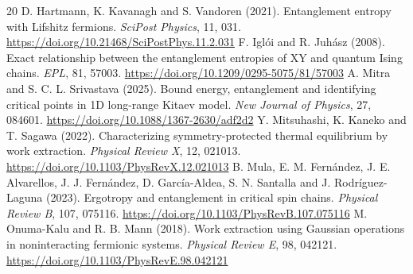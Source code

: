 \documentclass[11pt,a4paper]{article}
\theoremstyle{remark}
\begin{document}
\begin{thebibliography}{20}
 D. Hartmann, K. Kavanagh and S. Vandoren (2021). Entanglement entropy with Lifshitz fermions. \emph{SciPost Physics}, 11, 031. \url{https://doi.org/10.21468/SciPostPhys.11.2.031}
 F. Igl\'oi and R. Juh\'asz (2008). Exact relationship between the entanglement entropies of XY and quantum Ising chains. \emph{EPL}, 81, 57003. \url{https://doi.org/10.1209/0295-5075/81/57003}
 A. Mitra and S. C. L. Srivastava (2025). Bound energy, entanglement and identifying critical points in 1D long-range Kitaev model. \emph{New Journal of Physics}, 27, 084601. \url{https://doi.org/10.1088/1367-2630/adf2d2}
 Y. Mitsuhashi, K. Kaneko and T. Sagawa (2022). Characterizing symmetry-protected thermal equilibrium by work extraction. \emph{Physical Review X}, 12, 021013. \url{https://doi.org/10.1103/PhysRevX.12.021013}
 B. Mula, E. M. Fern\'andez, J. E. Alvarellos, J. J. Fern\'andez, D. Garc\'ia-Aldea, S. N. Santalla and J. Rodr\'iguez-Laguna (2023). Ergotropy and entanglement in critical spin chains. \emph{Physical Review B}, 107, 075116. \url{https://doi.org/10.1103/PhysRevB.107.075116}
 M. Onuma-Kalu and R. B. Mann (2018). Work extraction using Gaussian operations in noninteracting fermionic systems. \emph{Physical Review E}, 98, 042121. \url{https://doi.org/10.1103/PhysRevE.98.042121}
\end{thebibliography}
\end{document}

